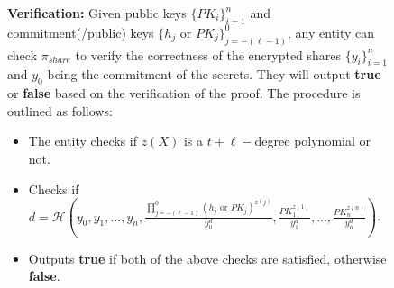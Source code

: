 \begin{figure}[ht]
{\begin{tcolorbox}[title=\textbf{$\Lambda_{RO}^{packed}$}, width=1.2\textwidth, colframe=blue!75!black, colback=blue!10, sharp corners]
        \vspace{0.5em}
        \textbf{Verification:}
            Given public keys $\{PK_i\}_{i=1}^n$ and commitment(/public) keys $\{h_j\text{ or }PK_j\}_{j=-(\ell-1)}^0$, any entity can check 
            $\pi_{share}$ to verify the correctness of the encrypted shares $\{y_i\}_{i=1}^n$ and $y_0$ being the commitment of the secrets. 
            They will output \textbf{true} or \textbf{false} based on the verification of the proof. The 
            procedure is outlined as follows:
        \begin{itemize}
            \item The entity checks if $z(X)$ is a $t+\ell-$degree polynomial or not.
            \item Checks if $d=\mathcal{H}(y_0,y_1,\dots,y_n,\frac{\prod_{j=-(\ell-1)}^{0}(h_j\text{ or }PK_j)^{z(j)}}{y_0^d},\frac{PK_1^{z(1)}}{y_1^d},\dots,\frac{PK_n^{z(n)}}{y_n^d})$.
            \item Outputs \textbf{true} if both of the above checks are satisfied, otherwise \textbf{false}.
        \end{itemize}


\end{tcolorbox}}
\end{figure}
